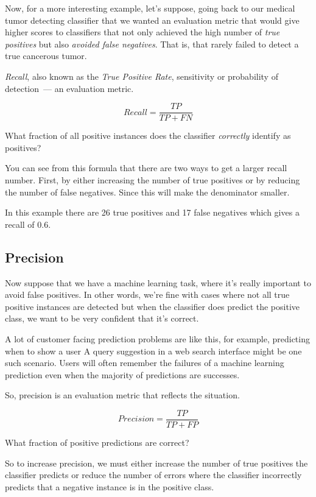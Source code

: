\begin{multicols}{2}
Now, for a more interesting example, let's suppose, going back to our medical tumor detecting classifier that we wanted an evaluation metric that would give higher scores to classifiers that not only achieved the high number of \emph{true positives} but also \emph{avoided false negatives}. That is, that rarely failed to detect a true cancerous tumor. 

\emph{Recall}, also known as the \emph{True Positive Rate}, sensitivity or probability of detection~--- an evaluation metric. 

$$Recall = \frac{TP}{TP + FN}$$

What fraction of all positive instances does the classifier \emph{correctly} identify as positives?

You can see from this formula that there are two ways to get a larger recall number. First, by either increasing the number of true positives or by reducing the number of false negatives. Since this will make the denominator smaller. 

In this example there are 26 true positives and 17 false negatives which gives a recall of 0.6. 



\subsection{Precision}

Now suppose that we have a machine learning task, where it's really important to avoid false positives. In other words, we're fine with cases where not all true positive instances are detected but when the classifier does predict the positive class, we want to be very confident that it's correct. 

A lot of customer facing prediction problems are like this, for example, predicting when to show a user A query suggestion in a web search interface might be one such scenario. Users will often remember the failures of a machine learning prediction even when the majority of predictions are successes. 

So, precision is an evaluation metric that reflects the situation. 

$$Precision = \frac{TP}{TP + FP}$$

What fraction of positive predictions are correct?

So to increase precision, we must either increase the number of true positives the classifier predicts or reduce the number of errors where the classifier incorrectly predicts that a negative instance is in the positive class. 


\end{multicols}
